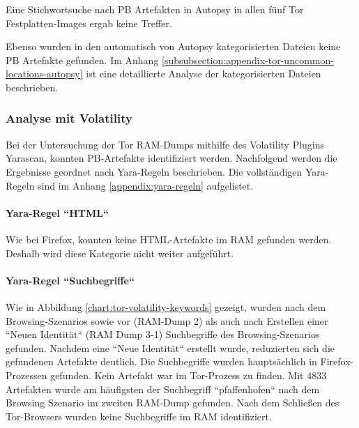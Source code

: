 Eine Stichwortsuche nach PB Artefakten in Autopsy in allen fünf Tor Festplatten-Images ergab keine Treffer.

Ebenso wurden in den automatisch von Autopsy kategorisierten Dateien keine PB Artefakte gefunden. 
Im Anhang \ref{subsubsection:appendix-tor-uncommon-locations-autopsy} ist eine detaillierte Analyse der kategorisierten Dateien beschrieben.


\subsubsection*{Analyse mit Volatility}
Bei der Untersuchung der Tor RAM-Dumps mithilfe des Volatility Plugins Yarascan, konnten PB-Artefakte identifiziert werden.
Nachfolgend werden die Ergebnisse geordnet nach Yara-Regeln beschrieben. Die vollständigen Yara-Regeln sind im Anhang \ref{appendix:yara-regeln} aufgelistet.

\paragraph*{Yara-Regel ``HTML``}
Wie bei Firefox, konnten keine HTML-Artefakte im RAM gefunden werden. Deshalb wird diese Kategorie nicht weiter aufgeführt.

\paragraph*{Yara-Regel ``Suchbegriffe``}
Wie in Abbildung \ref{chart:tor-volatility-keywords} gezeigt, wurden nach dem Browsing-Szenarios sowie vor (RAM-Dump 2) als auch nach Erstellen einer ``Neuen Identität`` (RAM Dump 3-1) Suchbegriffe des Browsing-Szenarios gefunden.
Nachdem eine ``Neue Identität`` erstellt wurde, reduzierten sich die gefundenen Artefakte deutlich. 
Die Suchbegriffe wurden hauptsächlich in Firefox-Prozessen gefunden. Kein Artefakt war im Tor-Prozess zu finden.
Mit 4833 Artefakten wurde am häufigsten der Suchbegriff ``pfaffenhofen`` nach dem Browsing Szenario im zweiten RAM-Dump gefunden. 
Nach dem Schließen des Tor-Browsers wurden keine Suchbegriffe im RAM identifiziert.

